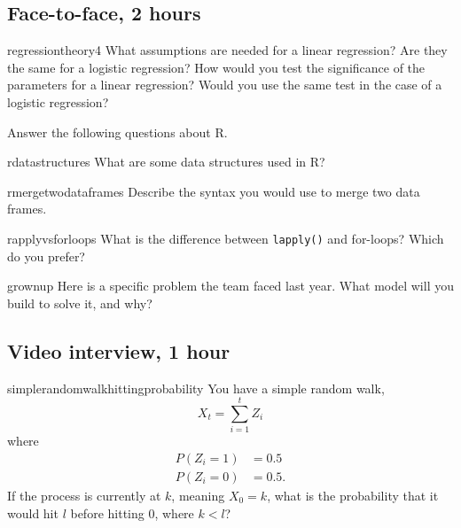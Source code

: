 \documentclass[a4paper]{article}
\begin{document}
\clearpage
\subsection{Face-to-face, 2 hours}
\begin{question}{regressiontheory4}
What assumptions are needed for a linear regression?
Are they the same for a logistic regression?
How would you test the significance of the parameters for a linear regression?
Would you use the same test in the case of a logistic regression?
\end{question}


\begin{questionwithnoanswer}
Answer the following questions about R.
\end{questionwithnoanswer}

\begin{subquestion}{rdatastructures}
What are some data structures used in R?
\end{subquestion}



\begin{subquestion}{rmergetwodataframes}
Describe the syntax you would use to merge two data frames.
\end{subquestion}



\begin{subquestion}{rapplyvsforloops}
What is the difference between \verb+lapply()+ and for-loops?
Which do you prefer?
\end{subquestion}


\begin{question}{grownup}
Here is a specific problem the team faced last year.
What model will you build to solve it, and why?
\end{question}

 \clearpage


\clearpage




\clearpage
\subsection{Video interview, 1 hour}
\begin{question}{simplerandomwalkhittingprobability}
You have a simple random walk,
\[
  X_t = \sum_{i=1}^{t}{Z_i}
\]
where
\begin{align*}
 P(Z_i = 1) &= 0.5 \\
 P(Z_i = 0) &= 0.5
 \text{.}
\end{align*}
If the process is currently at $k$, meaning $X_0=k$, what is the probability that it would hit $l$ before hitting $0$,
where $k < l$?
\end{question}
\end{document}
